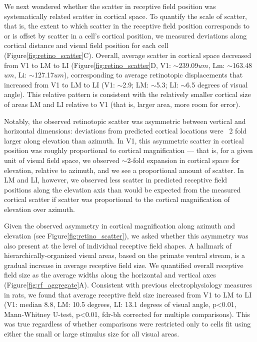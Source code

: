 We next wondered whether the scatter in receptive field position was systematically related scatter in cortical space. To quantify the scale of scatter, that is, the extent to which scatter in the receptive field position corresponds to or is offset by scatter in a cell's cortical position, we measured deviations along cortical distance and visual field position for each cell (Figure\ref{fig:retino_scatter}C). Overall, average scatter in cortical space decreased from V1 to LM to LI (Figure\ref{fig:retino_scatter}D, V1: $\sim$239.09$um$, Lm: $\sim$163.48$um$, Li: $\sim$127.17$um$), corresponding to average retinotopic displacements that increased from V1 to LM to LI (V1: $\sim$2.9; LM: $\sim$5.3; LI: $\sim$6.5 degrees of visual angle). This relative pattern is consistent with the relatively smaller cortical size of areas LM and LI relative to V1 (that is, larger area, more room for error).  

Notably, the observed retinotopic scatter was asymmetric between vertical and horizontal dimensions:  deviations from predicted cortical locations were ~2 fold larger along elevation than azimuth. In V1, this asymmetric scatter in cortical position was roughly proportional to cortical magnification --- that is, for a given unit of visual field space, we observed $\sim$2-fold expansion in cortical space  for elevation, relative to azimuth, and we see a proportional amount of scatter. In LM and LI, however, we observed less scatter in predicted receptive field positions along the elevation axis than would be expected from the measured cortical scatter if scatter was proportional to the cortical magnification of elevation over azimuth.


Given the observed asymmetry in cortical magnification along azimuth and elevation (see Figure\ref{fig:retino_scatter}), we asked whether this asymmetry was also present at the level of individual receptive field shapes. A hallmark of hierarchically-organized visual areas, based on the primate ventral stream, is a gradual increase in average receptive field size\cite{Siegle2019AAreas, Tafazoli2017}. We quantified overall receptive field size as the average widths along the horizontal and vertical axes (Figure\ref{fig:rf_aggregate}A). Consistent with previous electrophysiology measures in rats\cite{Vermaercke2014, Tafazoli2017}, we found that average receptive field size increased from V1 to LM to LI (V1: median 8.8, LM: 10.5 degrees, LI: 13.1 degrees of visual angle, p<0.01, Mann-Whitney U-test, p<0.01, fdr-bh corrected for multiple comparisons). This was true regardless of whether comparisons were restricted only to cells fit using either the small or large stimulus size for all visual areas.  

